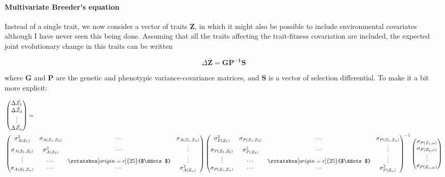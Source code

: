 \paragraph{Multivariate Breeder's equation}
Instead of a single trait, we now consider a vector of traits $\boldsymbol{Z}$, in which it might also be possible to include environmental covariates although I have never seen this being done. Assuming that all the traits affecting the trait-fitness covariation are included, the expected joint evolutionary change in this traits can be written

\begin{equation}
\Delta \boldsymbol{\bar{Z}}=\boldsymbol{GP^{-1}S}
\label{MVBE}
\end{equation}

where $\boldsymbol{G}$  and $\boldsymbol{P}$ are the genetic and phenotypic variance-covariance matrices, and $\boldsymbol{S}$ is a vector of selection differential. To make it a bit more explicit:

\begin{align*}
	&\begin{pmatrix}
	\Delta \bar{Z_1}\\
    \Delta \bar{Z_2}\\
    \vdots\\
    \Delta \bar{Z_n}\\
	\end{pmatrix}
    =\\
    &\begin{pmatrix}
	\sigma_{A(Z_1)}^2 & \sigma_{A(Z_1,Z_2)} & \cdots & \sigma_{A(Z_1,Z_n)}\\
    \sigma_{A(Z_1,Z_2)} & \sigma_{A(Z_2)}^2 & \cdots & \vdots \\
    \vdots & \cdots & \mathrel{\rotatebox[origin=c]{25}{$\ddots$}} & \vdots \\
    \sigma_{A(Z_1,Z_n)}& \cdots & \cdots & \sigma_{A(Z_n)}^2\\
	\end{pmatrix}
    \begin{pmatrix}
	\sigma_{P(Z_1)}^2 & \sigma_{P(Z_1,Z_2)} & \cdots & \sigma_{P(Z_1,Z_n)}\\
    \sigma_{P(Z_1,Z_2)} & \sigma_{P(Z_2)}^2 & \cdots & \vdots \\
    \vdots & \cdots & \mathrel{\rotatebox[origin=c]{25}{$\ddots$}} & \vdots \\
    \sigma_{P(Z_1,Z_n)}& \cdots & \cdots & \sigma_{P(Z_n)}^2\\
	\end{pmatrix}^{-1}
    \begin{pmatrix}
	\sigma_{P(Z_1,\omega)}\\
    \sigma_{P(Z_2,\omega)}\\
    \vdots \\
    \sigma_{P(Z_n,\omega)}\\
	\end{pmatrix}   
\end{align*}

